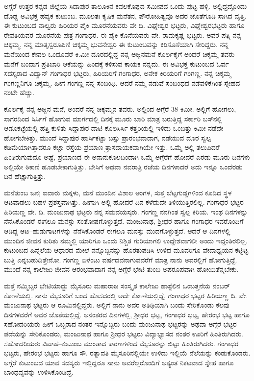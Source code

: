 ಅಗ್ಗೆರೆ ಉತ್ತರ ಕನ್ನಡ ಜಿಲ್ಲೆಯ ಸಿದಾಪುರ ತಾಲೂಕಿನ ಕವಲಕೊಪ್ಪದ ಸಮೀಪದ ಒಂದು ಪುಟ್ಟ ಹಳ್ಳಿ.  ಅಲ್ಲಿದ್ದದ್ದೊಂದು ದೊಡ್ಡ ಅವಿಭಕ್ತ ಹವ್ಯಕ ಕುಟುಂಬ.  ಮೂಲತಃ ಕೃಷಿಕ ಮನೆತನ, ಪೌರೋಹಿತ್ಯವೂ ಅದರ ಜೊತೆಗೂಡಿ ಸಾಗಿದ ವೃತ್ತಿ.  ಈ ಕುಟುಂಬದ ನಾಲ್ವರು ಹಿರಿಯರ ಪೈಕಿ ಮೂರನೆಯವರು ವೇ ದಿ. ವಿಘ್ನೇಶ್ವರ ಭಟ್ಟರು,  ವಿಘ್ನೇಶ್ವರಭಟ್ಟರು ಹಾಗೂ ರೇವತಿಯವರ ಮೂರನೆಯ ಪುತ್ರ ಗಂಗಾಧರ.  ಈ ಪೈಕಿ ಕೊನೆಯವರು ವೇ. ರಾಮಕೃಷ್ಣ ಭಟ್ಟರು.  ಅವರ ಪತ್ನಿ ನನ್ನ ಚಿಕ್ಕಮ್ಮ.  ನನ್ನ ಮಾತೃಸ್ವರೂಪಿಣಿ ಚಿಕ್ಕಮ್ಮ ಭುವನೇಶ್ವರಿ ಈ ಕುಟುಂಬವನ್ನು ಕಿರಿಸೊಸೆಯಾಗಿ ಸೇರಿದ್ದರು.  ನನ್ನ ಮನೆಯಿಂದ ಕೇವಲ ಒಂದೂವರೆ ಕಿ.ಮೀ ದೂರದಲ್ಲಿದ್ದ ನನ್ನ ಅಜ್ಜನಮನೆ ಕೊರ್ಲಕೈಗೆ ಅಂದರೆ ಚಿಕ್ಕಮ್ಮ ತವರು ಮನೆಗೆ ಬಂದಾಗ ಪ್ರತಿಬಾರಿ ಆಕೆಯನ್ನು ಹಿಂದಕ್ಕೆ ಕಳಿಸುವ ಕಾಯಕ ನನ್ನದು.  ಈ ಅವಿಭಕ್ತ ಕುಟುಂಬದ ಓರ್ವ ಸದಸ್ಯರಾದ ವಿದ್ವಾನ್ ಗಂಗಾಧರ ಭಟ್ಟರು, ಹಿರಿಯರಿಗೆ ಗಂಗಾಧರ, ಅನೇಕ ಕಿರಿಯರಿಗೆ ಗಂಗಣ್ಣ.  ನನ್ನ ಚಿಕ್ಕಮ್ಮ ಗಂಗಣ್ಣನಿಗೂ ಚಿಕ್ಕಮ್ಮ.  ಹೀಗೆ ಗಂಗಣ್ಣ ನನ್ನ ಸಂಬಂಧಿ.  ಆದರೆ ನಮ್ಮ ನಡುವೆ ಸಂಬಂಧದ ನಡೆವಳಿಕೆಗಿಂತ ಸ್ನೇಹದ ನಂಟೇ ಹೆಚ್ಚು. 

ಕೊರ್ಲಕೈ ನನ್ನ ಅಜ್ಜನ ಮನೆ, ಅಂದರೆ ನನ್ನ ಚಿಕ್ಕಮ್ಮನ ತವರು.  ಅಲ್ಲಿಂದ ಅಗ್ಗೆರೆ 38 ಕಿಮೀ.  ಅಲ್ಲಿಗೆ ಹೋಗಲು, ಸಾಗರದಿಂದ ಸಿರ್ಸಿಗೆ ಹೋಗುವ ಮಾರ್ಗದಲ್ಲಿ ದಿನಕ್ಕೆ ಮೂರು ಬಾರಿ ಮಾತ್ರ ಬರುತ್ತಿದ್ದ ಸರ್ಕಾರಿ ಬಸ್‍ನಲ್ಲಿ ಆಡೂಕಟ್ಟೆಯಲ್ಲಿ ಹತ್ತಿ ಕುಳಿತು ಸಿದ್ದಾಪುರ ದಾಟಿ ಕೊಲಸಿರ್ಸಿ ಕತ್ತರಿಯಲ್ಲಿ ಇಳಿದು ಒಂಬತ್ತು ಕಿಮೀ ನಡೆದೇ ಹೋಗಬೇಕಿತ್ತು.  ಮುಂದೆ ಸಿದ್ದಾಪುರ ಹಾರ್ಸಿಕಟ್ಟಾ ಬಸ್ಸು ಪ್ರಾರಂಭವಾದಾಗ, ನಡೆಯುವ ದೂರ ಸ್ವಲ್ಪ ಕಡಿಮೆಯಾಗಿತ್ತಾದರೂ ಕಚ್ಚಾ ರಸ್ತೆಯ ಪ್ರಯಾಣ ತ್ರಾಸದಾಯಕವಾಗಿಯೇ ಇತ್ತು.  ಒಮ್ಮೆ ಅಲ್ಲಿ ತಲುಪಿದರೆ ಹಿಂತಿರುಗುವುದೂ ಅಷ್ಟೆ, ಪ್ರಯಾಣದ ಈ ಅನಾನುಕೂಲದಿಂದಾಗಿ ಒಮ್ಮೆ ಅಗ್ಗೆರೆಗೆ ಹೋದರೆ ಎರಡು ಮೂರು ದಿನಗಳು ಅಲ್ಲಿಯೇ ಠಿಕಾಣಿ ಹೂಡಬೇಕಾಗುತ್ತಿತ್ತು.  ಬೇಸಿಗೆ ಅಥವಾ ನವರಾತ್ರಿ ರಜೆಯ ದಿನಗಳಾದರೆ ಅದು ಇನ್ನೂ ಒಂದೆರಡು ದಿನ ಹೆಚ್ಚಾಗುತ್ತಿತ್ತು.  

ಮನೆತುಂಬ ಜನ; ಐದಾರು ಮಕ್ಕಳು, ಮನೆ ಮುಂದಿನ ವಿಶಾಲ ಅಂಗಳ, ಸುತ್ತ ಬೆಟ್ಟಗುಡ್ಡಗಳಿಂದ ಕೂಡಿದ ಸ್ಥಳ ಆಟವಾಡಲು ಬಹಳ ಪ್ರಶಸ್ತವಾಗಿತ್ತು.  ಹೀಗಾಗಿ ಅಲ್ಲಿ ಹೋದರೆ ದಿನ ಕಳೆದುದೇ ತಿಳಿಯುತ್ತಿರಲಿಲ್ಲ.  ಗಂಗಾಧರ ಭಟ್ಟರ ಹಿರಿಯಣ್ಣ ವೇ. ದಿ. ಮಂಜುನಾಥ ಭಟ್ಟರು ನನ್ನ ಸಮವಯಸ್ಕರು.  ಗಂಗಣ್ಣ ನನಗಿಂತ ಸ್ವಲ್ಪ ಕಿರಿಯ.  ಇಂಥ ದಿನಗಳನ್ನು ನೆನೆಸಿಕೊಂಡರೆ ಈಗಲೂ ಮನಸ್ಸು ಸಂತೋಷಗೊಳ್ಳುತ್ತದೆ.  ಮಂಜುನಾಥ, ಶ್ರೀಧರ ಹಾಗೂ ಗಂಗಾಧರ ಇವರೊಂದಿಗೆ ಆಡಿದ್ದ ಆಟ–ಹುಡುಗಾಟಗಳನ್ನು ನೆನೆಸಿಕೊಂಡರೆ ಈಗಲೂ ಮನಸ್ಸು ಮುದಗೊಳ್ಳುತ್ತದೆ.  ಆದರೆ ಆ ದಿನಗಳಲ್ಲಿ ಮುಂದಿನ ಜೀವನ ಕುರಿತು ನಮ್ಮಲ್ಲಿ ಯಾರಿಗೂ ಒಂದು ನಿಶ್ಚಿತ ಗುರಿಯಾಗಲಿ ಉದ್ದೇಶವಾಗಲೀ ಅಂದು ಇದ್ದಂತಿರಲಿಲ್ಲ.  ಕುಟುಂಬದ ಹಿನ್ನೆಲೆಯ ಆಧಾರದ ಮೇಲೆ ನನ್ನೊಬ್ಬನನ್ನು ಹೊರತುಪಡಿಸಿ ಉಳಿದ ಮೂವರಿಗೂ ವೇದಾಧ್ಯಯನ ಕಟ್ಟಿಟ್ಟ ಬುತ್ತಿ ಎನ್ನಬಹುದಿತ್ತೇನೋ.  ಗಂಗಣ್ಣ ಏಳೆಂಟು ವರ್ಷದವನಾಗುವವರೆಗೆ ಮಾತ್ರ ನಾನು ಅವರಲ್ಲಿಗೆ ಹೋಗುತ್ತಿದ್ದೆ.  ಮುಂದೆ ನನ್ನ ಕಾಲೇಜು ಜೀವನ ಆರಂಭವಾದಾಗ ನನ್ನ ಅಗ್ಗೆರೆ ಭೇಟಿ ತುಂಬ ಅಪರೂಪವಾಗಿ ಹೋಯಿತೆನ್ನಬೇಕು. 

ಮತ್ತೆ ನಮ್ಮಿಬ್ಬರ ಭೇಟಿಯಾದ್ದು ಮೈಸೂರು ಮಹಾರಾಜ ಸಂಸ್ಕೃತ ಕಾಲೇಜು ಹಾಸ್ಟೆಲಿನ ಒಂಬತ್ತನೆಯ ನಂಬರ್ ಕೋಣೆಯಲ್ಲಿ.  ನಾನು ಮೈಸೂರಿಗೆ ಬಂದ ಹೊಸದರಲ್ಲಿ ಅದೇ ಕೋಣೆಯಲ್ಲಿದ್ದೆ, ಗಂಗಾಧರ ಭಟ್ಟರ ಹಿರಿಯಣ್ಣ ದಿ. ವೇ. ಮಂಜುನಾಥ ಭಟ್ಟರು ಆ ರೂಮಿನಲ್ಲಿದ್ದರು.  ಅಲ್ಲಿಗೆ ನಾನು ಅವರ ಅತಿಥಿಯಾಗಿ ಬಂದು ಸೇರಿಕೊಂಡು ಕೆಲವು ದಿನಗಳವರೆಗೆ ಅವರ ಜೊತೆಯಲ್ಲಿದ್ದೆ.  ಅನಂತರದ ದಿನಗಳಲ್ಲಿ, ಶ್ರೀಧರ ಭಟ್ಟ, ಗಂಗಾಧರ ಭಟ್ಟ, ಹೇರಂಭ ಭಟ್ಟ ಹಾಗೂ ಸಹೋದರಿಯರು ಹೀಗೆ ಒಬ್ಬರಾದ ನಂತರ ಇನ್ನೊಬ್ಬರು ಬಂದು ಮಂಜುನಾಥ ಭಟ್ಟರನ್ನು ಅಥವಾ ಅಗ್ಗೆರೆ ಭಟ್ಟರ ಪಡೆಯನ್ನು ಸೇರಿಕೊಂಡರು,  ಮಂಜುನಾಥ ಹಾಗೂ ಶ್ರೀಧರ ಭಟ್ಟರು ವಿದ್ಯಾಭ್ಯಾಸದ ನಂತರ ಊರಿಗೆ ಹಿಂತಿರುಗಿದರು.  ಸಹೋದರಿಯರು ವಿವಾಹ–ಕುಟುಂಬ ಮುಂತಾದ ಕಾರಣಗಳಿಂದ ಮೈಸೂರನ್ನು ಬಿಟ್ಟು ಹಿಂತಿರುಗಿದರು.  ಗಂಗಾಧರ ಭಟ್ಟರು, ಹೇರಂಭ ಭಟ್ಟರು ಹಾಗೂ ಸೌ. ರತ್ನಾವತಿ ಮೈಸೂರಿನಲ್ಲಿಯೇ ಉಳಿದು ಇಲ್ಲಿಯೆ ನೆಲೆಯನ್ನು ಕಂಡುಕೊಂಡರು.  ಅಗ್ಗೆರೆ ಕುಟುಂಬದ ಯಾವ ಸದಸ್ಯರು ಇಲ್ಲಿದ್ದರೂ ನಾನು ಅವರೆಲ್ಲರೊಂದಿಗೆ ಅತ್ಯಂತ ನಿಕಟವಾದ ಸ್ನೇಹ ಹಾಗೂ ಬಾಂಧವ್ಯವನ್ನು ಉಳಿಸಿಕೊಂಡಿದ್ದೆ.  

